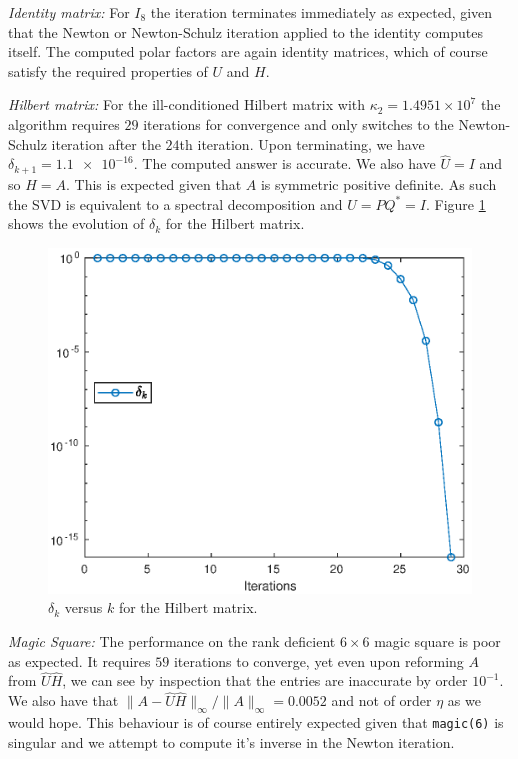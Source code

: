 \documentclass[12pt]{article}
\def\normo#1{\|#1\|_{\infty}}
\begin{document}
\textit{Identity matrix:} For $I_8$ the iteration terminates immediately as
expected, given that the Newton or Newton-Schulz iteration applied to the
identity computes itself. The computed polar factors are again identity
matrices, which of course satisfy the required properties of $U$ and $H$.

\textit{Hilbert matrix:} For the ill-conditioned Hilbert matrix with
$\kappa_2 = 1.4951\times 10^7$ the algorithm requires $29$ iterations for
convergence and only switches to the Newton-Schulz iteration after the $24$th
iteration. Upon terminating, we have $\delta_{k+1} = \num{1.1e-16}$. The
computed answer is accurate. We also have $\hat{U} = I$ and so $\hat{H} = A$.
This is expected given that $A$ is symmetric positive definite.
As such the SVD is equivalent to a spectral decomposition and $U = PQ^* = I$.
Figure \ref{fig:hilb} shows the evolution of $\delta_k$ for the Hilbert matrix. 
\begin{figure}
  \centering
  \includegraphics[scale=0.8]{hilb}
  \caption{$\delta_k$ versus $k$ for the Hilbert matrix.}
  \label{fig:hilb}    
\end{figure}

\textit{Magic Square:}
The performance on the rank deficient $6\times 6$ magic
square is poor as expected. It requires $59$ iterations to converge, yet even
upon reforming $A$ from $\hat{U}\hat{H}$, we can see by inspection that the
entries are inaccurate by order $10^{-1}$. We also have that
$\normo{A - \hat{U}\hat{H}}/\normo{A} = 0.0052$ and not of order $\eta$ as we
would hope. This behaviour is of course entirely expected given that
\texttt{magic(6)} is singular and we attempt to compute it's inverse in the
Newton iteration.
\end{document}
